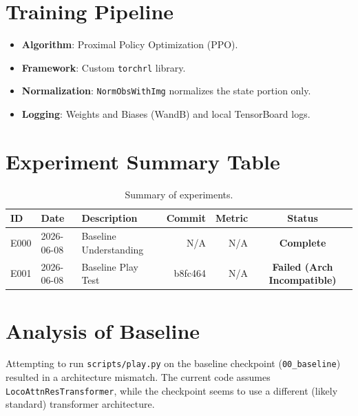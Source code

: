 \documentclass{article}
\begin{document}
\section{Training Pipeline}
\begin{itemize}
    \item \textbf{Algorithm}: Proximal Policy Optimization (PPO).
    \item \textbf{Framework}: Custom \texttt{torchrl} library.
    \item \textbf{Normalization}: \texttt{NormObsWithImg} normalizes the state portion only.
    \item \textbf{Logging}: Weights and Biases (WandB) and local TensorBoard logs.
\end{itemize}

\section{Experiment Summary Table}
\begin{table}[h!]
\centering
\setlength{\tabcolsep}{8pt}
\renewcommand{\arraystretch}{1.2}
\begin{tabular}{lllrrc}
\toprule
ID & Date & Description & Commit & Metric & Status \\
\midrule
E000 & 2026-06-08 & Baseline Understanding & N/A & N/A & \textbf{Complete} \\
E001 & 2026-06-08 & Baseline Play Test & b8fc464 & N/A & \textbf{Failed (Arch Incompatible)} \\
\bottomrule
\end{tabular}
\caption{Summary of experiments.}
\end{table}

\section{Analysis of Baseline}
Attempting to run \texttt{scripts/play.py} on the baseline checkpoint (\texttt{00\_baseline}) resulted in a architecture mismatch. The current code assumes \texttt{LocoAttnResTransformer}, while the checkpoint seems to use a different (likely standard) transformer architecture.
\end{document}
